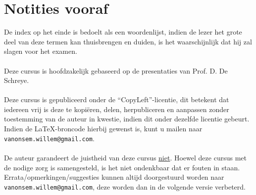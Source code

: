 \documentclass[titlepage,a4paper,twoside]{article}
\begin{document}
\section*{Notities vooraf}
\begin{it}
De index op het einde is bedoelt als een woordenlijst, indien de lezer het grote deel van deze termen kan thuisbrengen en duiden, is het waarschijnlijk dat hij zal slagen voor het examen.
\\\\
Deze cursus is hoofdzakelijk gebaseerd op de presentaties van Prof. D. De Schreye. 
\\\\
Deze cursus is gepubliceerd onder de ``CopyLeft''-licentie, dit betekent dat iedereen vrij is deze te kopiëren, delen, herpubliceren en aanpassen zonder toestemming van de auteur in kwestie, indien dit onder dezelfde licentie gebeurt.\\ Indien de \LaTeX-broncode hierbij gewenst is, kunt u mailen naar {\tt vanonsem.willem@gmail.com}.
\\\\
De auteur garandeert de juistheid van deze cursus \underline{niet}. Hoewel deze cursus met de nodige zorg is samengesteld, is het niet ondenkbaar dat er fouten in staan. Errata/opmerkingen/suggesties kunnen altijd doorgestuurd worden naar {\tt vanonsem.willem@gmail.com}, deze worden dan in de volgende versie verbeterd.


\end{it}
\end{document}
